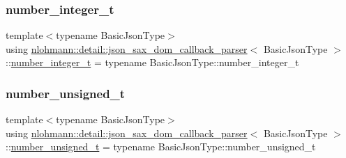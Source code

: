 \mbox{\label{classnlohmann_1_1detail_1_1json__sax__dom__callback__parser_a3ba8fc7a8d83c5b0eeb3b543ad844b8d}} 
\subsubsection{\texorpdfstring{number\+\_\+integer\+\_\+t}{number\_integer\_t}}
{\footnotesize\ttfamily template$<$typename Basic\+Json\+Type$>$ \\
using \hyperlink{classnlohmann_1_1detail_1_1json__sax__dom__callback__parser}{nlohmann\+::detail\+::json\+\_\+sax\+\_\+dom\+\_\+callback\+\_\+parser}$<$ Basic\+Json\+Type $>$\+::\hyperlink{classnlohmann_1_1detail_1_1json__sax__dom__callback__parser_a3ba8fc7a8d83c5b0eeb3b543ad844b8d}{number\+\_\+integer\+\_\+t} =  typename Basic\+Json\+Type\+::number\+\_\+integer\+\_\+t}

\mbox{\label{classnlohmann_1_1detail_1_1json__sax__dom__callback__parser_a2406c5125f7128fb9c01921df2903001}} 
\subsubsection{\texorpdfstring{number\+\_\+unsigned\+\_\+t}{number\_unsigned\_t}}
{\footnotesize\ttfamily template$<$typename Basic\+Json\+Type$>$ \\
using \hyperlink{classnlohmann_1_1detail_1_1json__sax__dom__callback__parser}{nlohmann\+::detail\+::json\+\_\+sax\+\_\+dom\+\_\+callback\+\_\+parser}$<$ Basic\+Json\+Type $>$\+::\hyperlink{classnlohmann_1_1detail_1_1json__sax__dom__callback__parser_a2406c5125f7128fb9c01921df2903001}{number\+\_\+unsigned\+\_\+t} =  typename Basic\+Json\+Type\+::number\+\_\+unsigned\+\_\+t}

